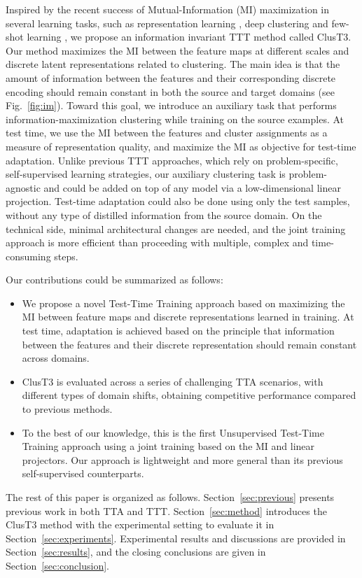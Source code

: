 \documentclass{article}
\begin{document}
Inspired by the recent success of Mutual-Information (MI) maximization in several learning tasks, such as representation learning \cite{ji2019invariant,hu2017learning,oord2018representation,tschannenmutual}, deep clustering \cite{Jabi21} and few-shot learning \cite{TIM}, we propose an information invariant TTT method called ClusT3. Our method maximizes the MI between the feature maps at different scales and discrete latent representations related to clustering. The main idea is that the amount of information between the features and their corresponding discrete encoding should remain constant in both the source and target domains (see Fig.~\ref{fig:im}). Toward this goal, we introduce an auxiliary task that performs information-maximization clustering while training on the source examples. At test time, we use the MI between the features and cluster assignments as a measure of representation quality, and maximize the MI as objective for test-time adaptation. Unlike previous TTT approaches, which rely on problem-specific, self-supervised learning strategies, our auxiliary clustering task is problem-agnostic and could be added on top of any model via a low-dimensional linear projection. Test-time adaptation could also be done using only the test samples, without any type of distilled information from the source domain. On the technical side, minimal architectural changes are needed, and the joint training approach is more efficient than proceeding with multiple, complex and time-consuming steps. 

Our contributions could be summarized as follows:
\begin{itemize}
    \item We propose a novel Test-Time Training approach based on maximizing the MI between feature maps and discrete representations learned in training. At test time, adaptation is achieved based on the principle that information between the features and their discrete representation should remain constant across domains. 
    \item ClusT3 is evaluated across a series of challenging TTA scenarios, with different types of domain shifts, obtaining competitive performance compared to previous methods. 
    \item To the best of our knowledge, this is the first Unsupervised Test-Time Training approach using  a joint training based on the MI and linear projectors. Our approach is lightweight and more general than its previous self-supervised counterparts. 
\end{itemize}
The rest of this paper is organized as follows. Section~\ref{sec:previous} presents previous work in both TTA and TTT. Section~\ref{sec:method} introduces the ClusT3 method with the experimental setting to evaluate it in Section~\ref{sec:experiments}. Experimental results and discussions are provided in Section~\ref{sec:results}, and the closing conclusions are given in Section~\ref{sec:conclusion}.
\end{document}
